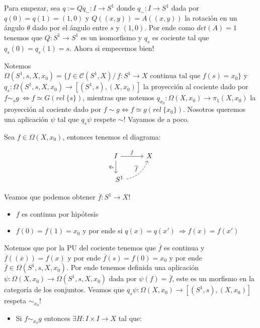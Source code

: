 \documentclass[11pt]{article}
\newenvironment{proof}[1][Demostraci\'on]{\begin{trivlist}
\item[\hskip \labelsep {\bfseries #1}]}{\end{trivlist}}
\newcommand{\CC}{\mathcal{C}}
\begin{document}
\begin{enumerate}
\begin{proof}

Para empezar, sea $q := Qq_{\sim}:I \rightarrow S^1$ donde $q_{\sim}:I \rightarrow S^1$ dada por $q(0)=q(1)=(1,0)$ y $Q((x,y))=A((x,y))$ la rotaci\'on en un \'angulo $\theta$ dado por el \'angulo entre $s$ y $(1,0)$. Por ende como $det(A)=1$ tenemos que $Q:S^1 \rightarrow S^1$ es un isomorfismo y $q_s$ es cociente tal que $q_s(0)=q_s(1)=s$. Ahora si empecemos bien!

Notemos $\Omega(S^1,s,X,x_0)=\{f \in \CC(S^1,X) /\,  f:S^1\to X  \text{ continua tal que } f(s)=x_0\}$ y $q_s:\Omega(S^1,s,X,x_0) \rightarrow [(S^1,s),(X,x_0)]$ la proyecci\'on al cociente dado por $f \sim_s g \ \Longleftrightarrow f \simeq G (rel \ \{s\})$, mientras que notemos $q_{x_0}: \Omega(X,x_0) \rightarrow \pi_1(X,x_0)$ la proyecci\'on al cociente dado por $f \sim g \Longleftrightarrow f \simeq g (rel \ \{x_0\})$. Nosotros queremos una aplicaci\'on $\psi$ tal que $q_s\psi$ respete $\sim$! Vayamos de a poco.

Sea $f \in \Omega(X,x_0)$, entonces tenemos el diagrama:

\[
\begin{tikzcd}
I \arrow{r}{f} \arrow[swap]{d}{q_{s}} & X \\ \quad
S^1 \arrow[dashed,bend right]{ur}{\overline{f}}
\end{tikzcd}
\]

Veamos que podemos obtener $\overline{f}:S^1 \rightarrow X$!

\begin{itemize}
\item $f$ es continua por hip\'otesis
\item $f(0)=f(1)=x_0$ y por ende si $q(x)=q(x') \ \Longrightarrow f(x)=f(x')$
\end{itemize}

Notemos que por la PU del cociente tenemos que $\overline{f}$ es continua y $\overline{f}((\overline{x}))=f(x)$ y por ende $\overline{f}(s)=f(0)=x_0$ y por ende $\overline{f} \in \Omega(S^1,s,X,x_0)$. Por ende tenemos definida una aplicaci\'on $\psi:\Omega(X,x_0) \rightarrow \Omega(S^1,s,X,x_0)$ dada por $\psi(f)=\overline{f}$, este es un morfismo en la categor\'ia de los conjuntos. Veamos que $q_s\psi:\Omega(X,x_0) \rightarrow  [(S^1,s),(X,x_0)]$ respeta $\sim_{x_0}$!

\begin{itemize}

\item Si $f \sim_{x_0} g$ entonces $\exists H:I \times I \rightarrow X$ tal que:


\end{itemize}
\end{proof}
\end{enumerate}
\end{document}
